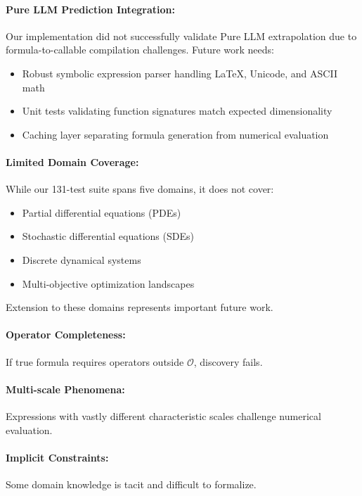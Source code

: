 \paragraph{Pure LLM Prediction Integration:} Our implementation did not successfully validate Pure LLM extrapolation due to formula-to-callable compilation challenges. Future work needs:
\begin{itemize}
\item Robust symbolic expression parser handling LaTeX, Unicode, and ASCII math
\item Unit tests validating function signatures match expected dimensionality
\item Caching layer separating formula generation from numerical evaluation
\end{itemize}

\paragraph{Limited Domain Coverage:} While our 131-test suite spans five domains, it does not cover:
\begin{itemize}
\item Partial differential equations (PDEs)
\item Stochastic differential equations (SDEs)
\item Discrete dynamical systems
\item Multi-objective optimization landscapes
\end{itemize}

Extension to these domains represents important future work.

\paragraph{Operator Completeness:} If true formula requires operators outside $\mathcal{O}$, discovery fails.

\paragraph{Multi-scale Phenomena:} Expressions with vastly different characteristic scales challenge numerical evaluation.

\paragraph{Implicit Constraints:} Some domain knowledge is tacit and difficult to formalize.

